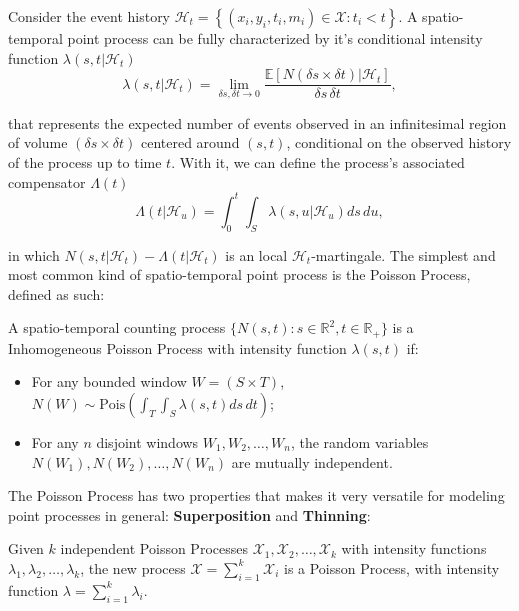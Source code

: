 Consider the event history $\mathcal{H}_{t} = \left\{(x_{i},y_{i},t_{i},m_{i}) \in \mathcal{X} : t_{i} < t\right\}$. A spatio-temporal point process can be fully characterized by it's conditional intensity function $\lambda(s,t | \mathcal{H}_{t})$ \cite{daley_jones_2003}
\begin{equation}
  \label{eq-intensity-function}
  \lambda(s,t|\mathcal{H}_{t}) = \lim_{\delta s,\delta t \to 0}\frac{\mathds{E}\left[N(\delta s \times \delta t)|\mathcal{H}_{t}\right]}{\delta s\, \delta t},
\end{equation}

\noindent that represents the expected number of events observed in an infinitesimal region of volume $(\delta s \times \delta t)$ centered around $(s, t)$, conditional on the observed history of the process up to time $t$. With it, we can define the process's associated compensator $\Lambda(t)$
\begin{equation}
  \label{eq-compensator}
  \Lambda(t|\mathcal{H}_{u}) = \int_{0}^{t}\int_{S}\lambda(s,u|\mathcal{H}_{u})ds\,du,
\end{equation}

\noindent in which $N(s,t|\mathcal{H}_{t}) - \Lambda(t|\mathcal{H}_{t})$ is an local $\mathcal{H}_{t}$-martingale. The simplest and most common kind of spatio-temporal point process is the Poisson Process, defined as such:

\begin{definition}
  \label{def-poisson-process}
  A spatio-temporal counting process $\{N(s,t): s \in \mathds{R}^{2},t \in \mathds{R}_{+}\}$ is a Inhomogeneous Poisson Process with intensity function $\lambda(s,t)$ if:
  \begin{itemize}
  \item For any bounded window $W = (S \times T)$, $N(W) \sim \mathrm{Pois}\left(\int_{T}\int_{S}\lambda(s,t)ds \, dt\right)$;
  \item For any $n$ disjoint windows $W_{1}, W_{2}, \ldots, W_{n}$, the random variables $N(W_{1}), N(W_{2}), \ldots, N(W_{n})$ are mutually independent.
  \end{itemize}
\end{definition}

The Poisson Process has two properties that makes it very versatile for modeling point processes in general: \textbf{Superposition} and \textbf{Thinning}:

\begin{theorem}
  \label{teo-superposition}
  Given $k$ independent Poisson Processes $\mathcal{X}_{1}, \mathcal{X}_{2}, \ldots, \mathcal{X}_{k}$ with intensity functions $\lambda_{1}, \lambda_{2}, \ldots, \lambda_{k}$, the new process $\mathcal{X} = \sum_{i=1}^{k}\mathcal{X}_{i}$ is a Poisson Process, with intensity function $\lambda = \sum_{i=1}^{k}\lambda_{i}$.
\end{theorem}


